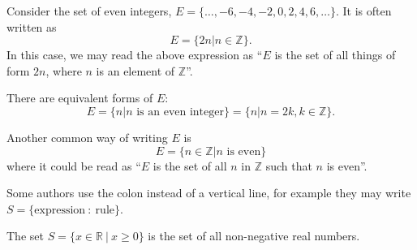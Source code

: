 \begin{example}
    Consider the set of even integers, $E = \{\dots, -6, -4, -2, 0, 2, 4, 6, \dots\}$. It is often written as
    \[
        E = \{2n \vert n \in \mathbb{Z}\}.
    \]
    In this case, we may read the above expression as ``$E$ is the set of all things of form $2n$, where $n$ is an element of $\mathbb{Z}$''.

    There are equivalent forms of $E$:
    \[
        E = \{n \vert n \textrm{ is an even integer}\} = \{n \vert n = 2k, k \in \mathbb{Z}\}.
    \]

    Another common way of writing $E$ is
    \[
        E = \{n \in \mathbb{Z} \vert n \textrm{ is even}\}
    \]
    where it could be read as ``$E$ is the set of all $n$ in $\mathbb{Z}$ such that $n$ is even''.
\end{example}
\begin{remark}
    Some authors use the colon instead of a vertical line, for example they may write $S = \{\mathrm{expression} \ : \ \mathrm{rule}\}$.
\end{remark}

\begin{example}
    The set $S = \{x \in \mathbb{R} \ | \ x \geq 0 \}$ is the set of all non-negative real numbers.
\end{example}

